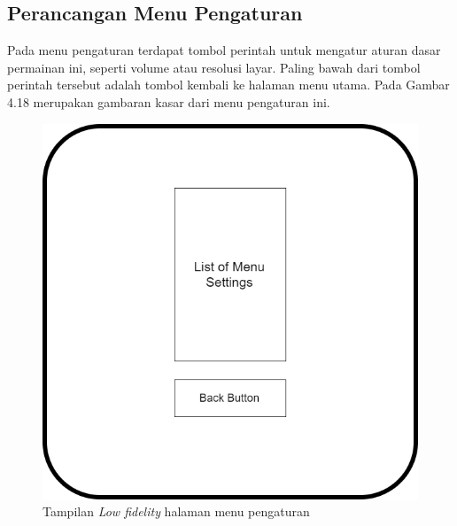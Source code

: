 	\subsection{Perancangan Menu Pengaturan}
	Pada menu pengaturan terdapat tombol perintah untuk mengatur aturan dasar permainan ini, seperti volume atau resolusi layar. Paling bawah dari tombol perintah tersebut adalah tombol kembali ke halaman menu utama. Pada Gambar 4.18 merupakan gambaran kasar dari menu pengaturan ini.
	\begin{figure}
		\centering
		\includegraphics[width=\linewidth-140pt]{pics/low/low2}
		\caption{Tampilan \textit{Low fidelity} halaman menu pengaturan}
	\end{figure}
	
